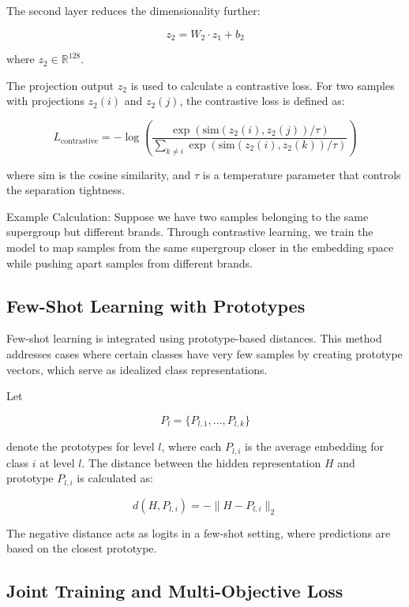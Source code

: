 \documentclass[9pt,a4paper,twoside]{rho-class/rho}
\begin{document}
The second layer reduces the dimensionality further:

\[ \label{eq:second_layer}
z_2 = W_2 \cdot z_1 + b_2
\]

where \( z_2 \in \mathbb{R}^{128} \). 

The projection output \( z_2 \) is used to calculate a contrastive loss. For two samples with projections \( z_2(i) \) and \( z_2(j) \), the contrastive loss is defined as:

\[ \label{eq:contrastive_loss}
L_{\text{contrastive}} = -\log\left(\frac{\exp\left(\text{sim}(z_2(i), z_2(j)) / \tau\right)}{\sum_{k \neq i} \exp\left(\text{sim}(z_2(i), z_2(k)) / \tau\right)}\right)
\]

where \( \text{sim} \) is the cosine similarity, and \( \tau \) is a temperature parameter that controls the separation tightness.

Example Calculation: Suppose we have two samples belonging to the same supergroup but different brands. Through contrastive learning, we train the model to map samples from the same supergroup closer in the embedding space while pushing apart samples from different brands.

    \subsection{Few-Shot Learning with Prototypes}

Few-shot learning is integrated using prototype-based distances. This method addresses cases where certain classes have very few samples by creating prototype vectors, which serve as idealized class representations.

Let 

\[
P_l = \{ P_{l,1}, \ldots, P_{l,k} \}
\]

denote the prototypes for level \( l \), where each \( P_{l,i} \) is the average embedding for class \( i \) at level \( l \). The distance between the hidden representation \( H \) and prototype \( P_{l,i} \) is calculated as:

\[ \label{eq:distance_prototype}
d(H, P_{l,i}) = -\| H - P_{l,i} \|_2
\]

The negative distance acts as logits in a few-shot setting, where predictions are based on the closest prototype.
        
    \subsection{Joint Training and Multi-Objective Loss}
\end{document}
